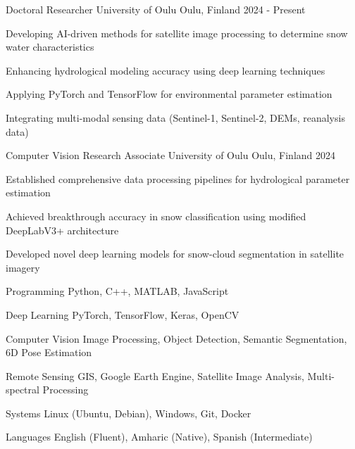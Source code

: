 \documentclass[13pt, a4paper]{awesome-cv}
\begin{document}
\begin{cventries}
  \cventry
    {Doctoral Researcher} %
    {University of Oulu} %
    {Oulu, Finland} %
    {2024 - Present} %
    {
      \begin{cvitems} %
        \item {Developing AI-driven methods for satellite image processing to determine snow water characteristics}
        \item {Enhancing hydrological modeling accuracy using deep learning techniques}
        \item {Applying PyTorch and TensorFlow for environmental parameter estimation}
        \item {Integrating multi-modal sensing data (Sentinel-1, Sentinel-2, DEMs, reanalysis data)}
      \end{cvitems}
    }

  \cventry
    {Computer Vision Research Associate} %
    {University of Oulu} %
    {Oulu, Finland} %
    {2024} %
    {
      \begin{cvitems} %
        \item {Established comprehensive data processing pipelines for hydrological parameter estimation}
        \item {Achieved breakthrough accuracy in snow classification using modified DeepLabV3+ architecture}
        \item {Developed novel deep learning models for snow-cloud segmentation in satellite imagery}
      \end{cvitems}
    }
\end{cventries}

\begin{cvskills}
  \cvskill
    {Programming} %
    {Python, C++, MATLAB, JavaScript} %

  \cvskill
    {Deep Learning} %
    {PyTorch, TensorFlow, Keras, OpenCV} %

  \cvskill
    {Computer Vision} %
    {Image Processing, Object Detection, Semantic Segmentation, 6D Pose Estimation} %

  \cvskill
    {Remote Sensing} %
    {GIS, Google Earth Engine, Satellite Image Analysis, Multi-spectral Processing} %

  \cvskill
    {Systems} %
    {Linux (Ubuntu, Debian), Windows, Git, Docker} %

  \cvskill
    {Languages} %
    {English (Fluent), Amharic (Native), Spanish (Intermediate)} %
\end{cvskills}
\end{document}
